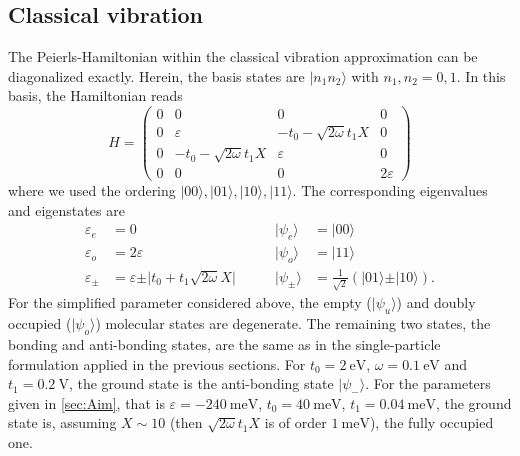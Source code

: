 \documentclass{article}
\begin{document}
\subsection{Classical vibration}
The Peierls-Hamiltonian within the classical vibration approximation can be diagonalized exactly.
Herein, the basis states are $\vert n_1 n_2\rangle$ with $n_1,n_2=0,1$. In this basis, the Hamiltonian reads
\begin{equation}
	H = \begin{pmatrix}
		0 & 0 & 0 & 0\\
		0 & \varepsilon & -t_0-\sqrt{2\omega}t_1X & 0\\
		0 & -t_0-\sqrt{2\omega}t_1X & \varepsilon & 0\\
		0 & 0 & 0 & 2\varepsilon
	\end{pmatrix}
\end{equation}
where we used the ordering $\vert 00\rangle,\vert 01\rangle,\vert 10\rangle,\vert 11\rangle$. The corresponding eigenvalues and eigenstates are
\begin{align}
	\varepsilon_e &= 0\qquad & \vert \psi_e\rangle &= \vert 00\rangle\\
	\varepsilon_o &= 2\varepsilon\qquad & \vert \psi_o\rangle &= \vert 11\rangle\\
	\varepsilon_\pm &= \varepsilon\pm \vert t_0+t_1\sqrt{2\omega}X\vert \qquad &\vert \psi_\pm\rangle &= \frac{1}{\sqrt{2}}(\vert 01\rangle \pm \vert 10\rangle).
\end{align}
For the simplified parameter considered above, the empty ($\vert\psi_u\rangle$) and doubly occupied ($\vert \psi_o\rangle$) molecular states are degenerate. The remaining two states, the bonding and anti-bonding states, are the same as in the single-particle formulation applied in the previous sections. For $t_0=\SI{2}{\electronvolt}$, $\omega=\SI{0.1}{\electronvolt}$ and $t_1=\SI{0.2}{\volt}$, the ground state is the anti-bonding state $\vert\psi_-\rangle$. For the parameters given in \cref{sec:Aim}, that is $\varepsilon=\SI{-240}{\milli\electronvolt}$, $t_0=\SI{40}{\milli\electronvolt}$, $t_1=\SI{0.04}{\milli\electronvolt}$, the ground state is, assuming $X\sim 10$ (then $\sqrt{2\omega}t_1X$ is of order  $\SI{1}{\milli\electronvolt}$), the fully occupied one.
\end{document}
